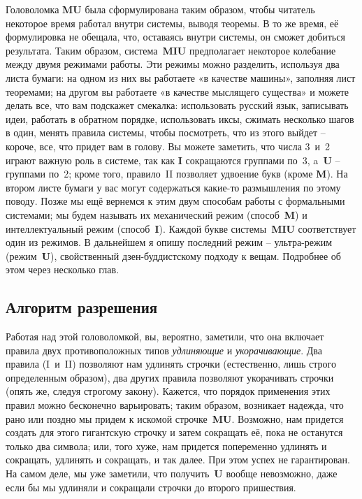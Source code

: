 \documentclass[../main.tex]{subfiles}
\begin{document}
Головоломка \textbf{MU} была сформулирована таким образом, чтобы читатель некоторое время работал внутри системы, выводя теоремы. В то же время, её формулировка не обещала, что, оставаясь внутри системы, он сможет добиться результата. Таким образом, система~\textbf{MIU} предполагает некоторое колебание между двумя режимами работы. Эти режимы можно разделить, используя два листа бумаги: на одном из них вы работаете «в качестве машины», заполняя лист теоремами; на другом вы работаете «в качестве мыслящего существа» и можете делать все, что вам подскажет смекалка: использовать русский язык, записывать идеи, работать в обратном порядке, использовать иксы, сжимать несколько шагов в один, менять правила системы, чтобы посмотреть, что из этого выйдет \--- короче, все, что придет вам в голову. Вы можете заметить, что числа 3~и~2 играют важную роль в системе, так как \textbf{I} сокращаются группами по~3, a~\textbf{U} \--- группами по~2; кроме того, правило~II позволяет удвоение букв (кроме \textbf{M}). На втором листе бумаги у вас могут содержаться какие-то размышления по этому поводу. Позже мы ещё вернемся к этим двум способам работы с формальными системами; мы будем называть их механический режим (способ~\textbf{M}) и интеллектуальный режим (способ~\textbf{I}). Каждой букве системы~\textbf{MIU} соответствует один из режимов. В дальнейшем я опишу последний режим \--- ультра-режим (режим~\textbf{U}), свойственный дзен-буддистскому подходу к вещам. Подробнее об этом через несколько глав.


\subsection{Алгоритм разрешения}

Работая над этой головоломкой, вы, вероятно, заметили, что она включает правила двух противоположных типов \emph{удлиняющие} и \emph{укорачивающие}. Два правила (I~и~II) позволяют нам удлинять строчки (естественно, лишь строго определенным образом), два других правила позволяют укорачивать строчки (опять же, следуя строгому закону). Кажется, что порядок применения этих правил можно бесконечно варьировать; таким образом, возникает надежда, что рано или поздно мы придем к искомой строчке~\textbf{MU}\@. Возможно, нам придется создать для этого гигантскую строчку и затем сокращать её, пока не останутся только два символа; или, того хуже, нам придется попеременно удлинять и сокращать, удлинять и сокращать, и так далее. При этом успех не гарантирован. На самом деле, мы уже заметили, что получить~\textbf{U} вообще невозможно, даже если бы мы удлиняли и сокращали строчки до второго пришествия.
\end{document}
